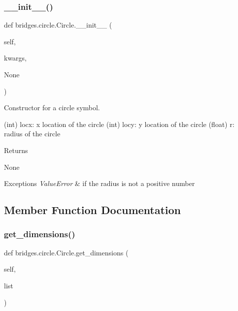 \subsubsection{\texorpdfstring{\+\_\+\+\_\+init\+\_\+\+\_\+()}{\_\_init\_\_()}}
{\footnotesize\ttfamily def bridges.\+circle.\+Circle.\+\_\+\+\_\+init\+\_\+\+\_\+ (\begin{DoxyParamCaption}\item[{}]{self,  }\item[{}]{kwargs,  }\item[{}]{None }\end{DoxyParamCaption})}



Constructor for a circle symbol. 

(int) locx\+: x location of the circle (int) locy\+: y location of the circle (float) r\+: radius of the circle \begin{DoxyReturn}{Returns}


None
\end{DoxyReturn}

\begin{DoxyExceptions}{Exceptions}
{\em Value\+Error} & if the radius is not a positive number \\
\hline
\end{DoxyExceptions}


\subsection{Member Function Documentation}
\mbox{\label{classbridges_1_1circle_1_1_circle_a8b6af5d39ec48245f0244a7499082822}} 
\subsubsection{\texorpdfstring{get\+\_\+dimensions()}{get\_dimensions()}}
{\footnotesize\ttfamily def bridges.\+circle.\+Circle.\+get\+\_\+dimensions (\begin{DoxyParamCaption}\item[{}]{self,  }\item[{}]{list }\end{DoxyParamCaption})}



